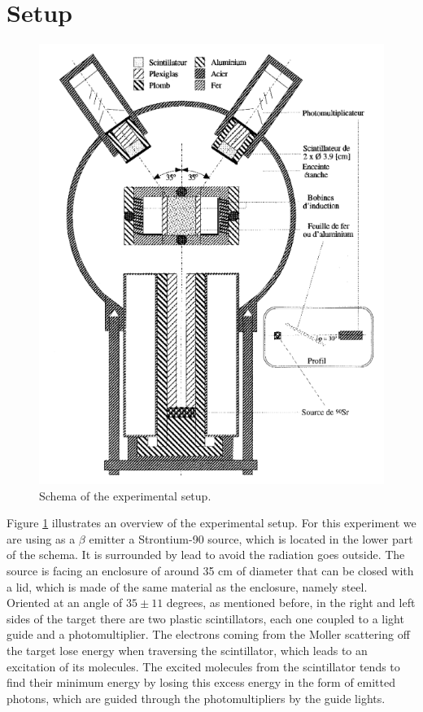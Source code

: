 \documentclass[10pt,swedish, openany]{book}
\begin{document}
\section{Setup}
\begin{figure}[h]
\includegraphics[scale=0.5]{setup.png}
\centering
\caption{Schema of the experimental setup.}
\label{fig:setup}
\end{figure}

Figure \ref{fig:setup} illustrates an overview of the experimental setup. For this experiment we are using as a $\beta$ emitter a Strontium-90 source, which is located in the lower part of the schema. It is surrounded by lead to avoid the radiation goes outside. The source is facing an enclosure of around 35 cm of diameter that can be closed with a lid, which is made of the same material as the enclosure, namely steel.\\

Oriented at an angle of $35 \pm 11$ degrees, as mentioned before, in the right and left sides of the target there are two plastic scintillators, each one coupled to a light guide and a photomultiplier. The electrons coming from the Moller scattering off the target lose energy when traversing the scintillator, which leads to an excitation of its molecules. The excited molecules from the scintillator tends to find their minimum energy by losing this excess energy in the form of emitted photons, which are guided through the photomultipliers by the guide lights.\\
\end{document}

